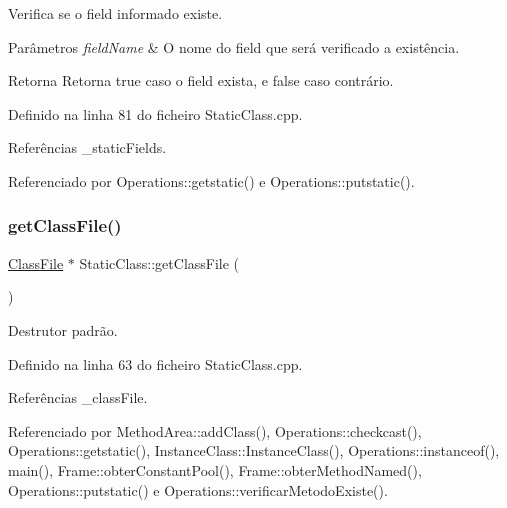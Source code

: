 Verifica se o field informado existe. 


\begin{DoxyParams}{Parâmetros}
{\em field\+Name} & O nome do field que será verificado a existência. \\
\hline
\end{DoxyParams}
\begin{DoxyReturn}{Retorna}
Retorna {\ttfamily true} caso o field exista, e {\ttfamily false} caso contrário. 
\end{DoxyReturn}


Definido na linha 81 do ficheiro Static\+Class.\+cpp.



Referências \+\_\+static\+Fields.



Referenciado por Operations\+::getstatic() e Operations\+::putstatic().

\mbox{\label{classStaticClass_ae00772669e7a0e54980ed303ff933cef}} 
\subsubsection{\texorpdfstring{get\+Class\+File()}{getClassFile()}}
{\footnotesize\ttfamily \hyperlink{classClassFile}{Class\+File} $\ast$ Static\+Class\+::get\+Class\+File (\begin{DoxyParamCaption}{ }\end{DoxyParamCaption})}



Destrutor padrão. 



Definido na linha 63 do ficheiro Static\+Class.\+cpp.



Referências \+\_\+class\+File.



Referenciado por Method\+Area\+::add\+Class(), Operations\+::checkcast(), Operations\+::getstatic(), Instance\+Class\+::\+Instance\+Class(), Operations\+::instanceof(), main(), Frame\+::obter\+Constant\+Pool(), Frame\+::obter\+Method\+Named(), Operations\+::putstatic() e Operations\+::verificar\+Metodo\+Existe().

\mbox{\label{classStaticClass_a24545b54a3e3b6ae17dc8cd04004c883}} 
